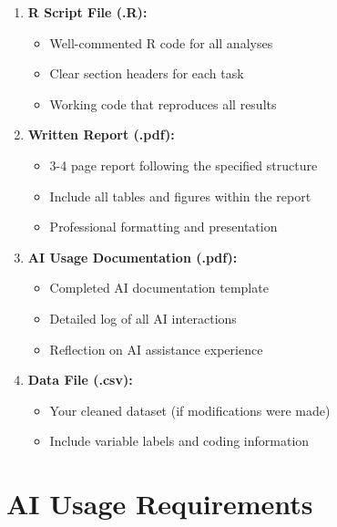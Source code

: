 \documentclass[11pt]{article}
\begin{document}
\begin{enumerate}
\item \textbf{R Script File (.R):}
   \begin{itemize}
   \item Well-commented R code for all analyses
   \item Clear section headers for each task
   \item Working code that reproduces all results
   \end{itemize}

\item \textbf{Written Report (.pdf):}
   \begin{itemize}
   \item 3-4 page report following the specified structure
   \item Include all tables and figures within the report
   \item Professional formatting and presentation
   \end{itemize}

\item \textbf{AI Usage Documentation (.pdf):}
   \begin{itemize}
   \item Completed AI documentation template
   \item Detailed log of all AI interactions
   \item Reflection on AI assistance experience
   \end{itemize}

\item \textbf{Data File (.csv):}
   \begin{itemize}
   \item Your cleaned dataset (if modifications were made)
   \item Include variable labels and coding information
   \end{itemize}
\end{enumerate}

\section{AI Usage Requirements}
\end{document}

